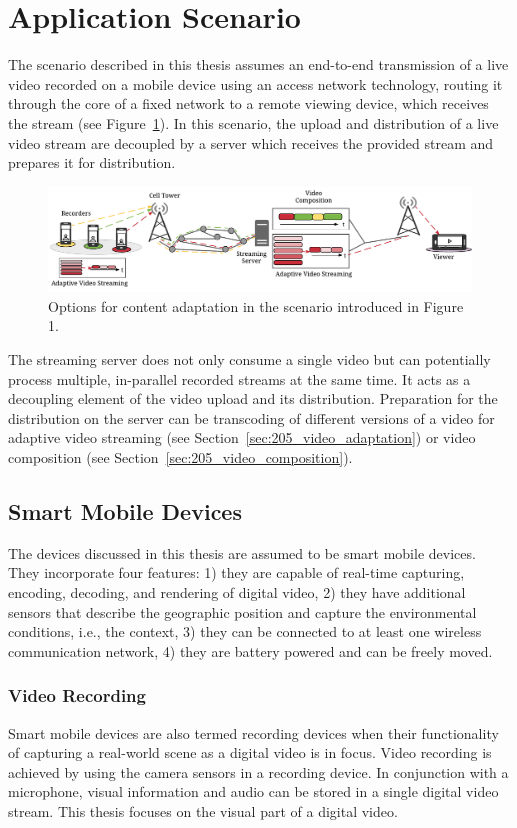 \section{Application Scenario}
The scenario described in this thesis assumes an end-to-end transmission of a live video recorded on a mobile device using an access network technology, routing it through the core of a fixed network to a remote viewing device, which receives the stream (see Figure~\ref{fig:205_relatedworkmbsstreaming}).
In this scenario, the upload and distribution of a live video stream are decoupled by a server which receives the provided stream and prepares it for distribution.
\begin{figure}[tbh]
\centering
\includegraphics[width=\linewidth]{gfx/200_Background/RelatedWork_MBS_Streaming}
\caption[Content Adaptation in the live video upload scenario]{Options for content adaptation in the scenario introduced in Figure 1.}
\label{fig:205_relatedworkmbsstreaming}
\end{figure}

The streaming server does not only consume a single video but can potentially process multiple, in-parallel recorded streams at the same time.
It acts as a decoupling element of the video upload and its distribution.
Preparation for the distribution on the server can be transcoding of different versions of a video for adaptive video streaming (see Section~\ref{sec:205_video_adaptation}) or video composition (see Section~\ref{sec:205_video_composition}).
\subsection{Smart Mobile Devices}
The devices discussed in this thesis are assumed to be smart mobile devices.
They incorporate four features: 1) they are capable of real-time capturing, encoding, decoding, and rendering of digital video, 2) they have additional sensors that describe the geographic position and capture the environmental conditions, i.e., the context, 3) they can be connected to at least one wireless communication network, 4) they are battery powered and can be freely moved.
\subsubsection{Video Recording}
Smart mobile devices are also termed recording devices when their functionality of capturing a real-world scene as a digital video is in focus.
Video recording is achieved by using the camera sensors in a recording device.
In conjunction with a microphone, visual information and audio can be stored in a single digital video stream.
This thesis focuses on the visual part of a digital video.

